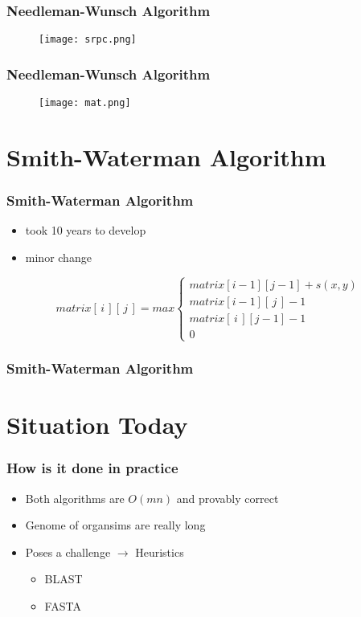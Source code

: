\documentclass{beamer}
\begin{document}
\begin{frame}[fragile]
\frametitle{Needleman-Wunsch Algorithm}
\begin{figure}
\centering
\texttt{[image: srpc.png]}
    
\end{figure}
\end{frame}

\begin{frame}[fragile]
    \frametitle{Needleman-Wunsch Algorithm}
\begin{figure}
    \centering
    \texttt{[image: mat.png]}
\end{figure}
\end{frame}

\section{Smith-Waterman Algorithm}
\begin{frame}
    
\frametitle{Smith-Waterman Algorithm}
\begin{itemize}
    \item took 10 years to develop
    \item minor change
\end{itemize}
\[
matrix[\, i \,][\, j \,]=max
\begin{cases}
    matrix[i-1][j-1] + s(x,y)\\
    matrix[i-1][\, j\, ] - 1
    \\ matrix[\, i\,][j-1] -1 
    \\ 0

  \end{cases}
\]
\end{frame}


\begin{frame}
\frametitle{Smith-Waterman Algorithm}
\end{frame}



\section{Situation Today}
\begin{frame}
    \frametitle{How is it done in practice}
    \begin{itemize}
        \item Both algorithms are $O(mn)$ and provably correct
        \item Genome of organsims are really long
        \item Poses a challenge $\rightarrow$ Heuristics 
        \begin{itemize}
            \item BLAST 
            \item FASTA 
        \end{itemize}
        
    \end{itemize}

    

\end{frame}
\end{document}
